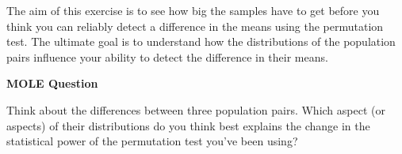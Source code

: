 \documentclass[]{book}
\newenvironment{Shaded}{\begin{snugshade}}{\end{snugshade}}
\newcommand{\KeywordTok}[1]{\textcolor[rgb]{0.13,0.29,0.53}{\textbf{{#1}}}}
\newcommand{\DecValTok}[1]{\textcolor[rgb]{0.00,0.00,0.81}{{#1}}}
\newcommand{\StringTok}[1]{\textcolor[rgb]{0.31,0.60,0.02}{{#1}}}
\newcommand{\CommentTok}[1]{\textcolor[rgb]{0.56,0.35,0.01}{\textit{{#1}}}}
\newcommand{\NormalTok}[1]{{#1}}
\begin{document}
\begin{Shaded}
\end{Shaded}

The aim of this exercise is to see how big the samples have to get
before you think you can reliably detect a difference in the means using
the permutation test. The ultimate goal is to understand how the
distributions of the population pairs influence your ability to detect
the difference in their means.

\begin{do-something}
\textbf{MOLE Question}

Think about the differences between three population pairs. Which aspect
(or aspects) of their distributions do you think best explains the
change in the statistical power of the permutation test you've been
using?
\end{do-something}


\end{document}
